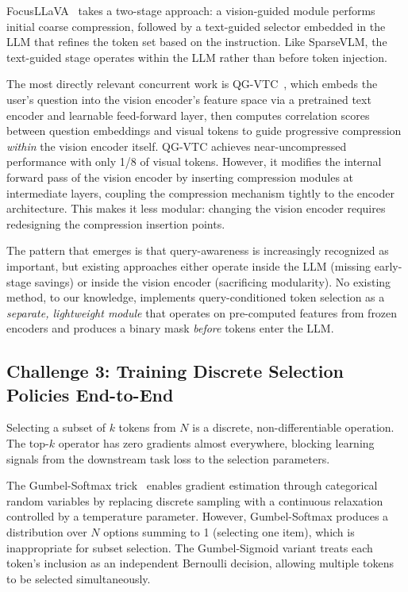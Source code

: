 \documentclass[11pt,twocolumn]{article}
\begin{document}
FocusLLaVA~\cite{zhu2024focusllava} takes a two-stage approach: a vision-guided module performs initial coarse compression, followed by a text-guided selector embedded in the LLM that refines the token set based on the instruction. Like SparseVLM, the text-guided stage operates within the LLM rather than before token injection.

The most directly relevant concurrent work is QG-VTC~\cite{li2025qgvtc}, which embeds the user's question into the vision encoder's feature space via a pretrained text encoder and learnable feed-forward layer, then computes correlation scores between question embeddings and visual tokens to guide progressive compression \emph{within} the vision encoder itself. QG-VTC achieves near-uncompressed performance with only 1/8 of visual tokens. However, it modifies the internal forward pass of the vision encoder by inserting compression modules at intermediate layers, coupling the compression mechanism tightly to the encoder architecture. This makes it less modular: changing the vision encoder requires redesigning the compression insertion points.

The pattern that emerges is that query-awareness is increasingly recognized as important, but existing approaches either operate inside the LLM (missing early-stage savings) or inside the vision encoder (sacrificing modularity). No existing method, to our knowledge, implements query-conditioned token selection as a \emph{separate, lightweight module} that operates on pre-computed features from frozen encoders and produces a binary mask \emph{before} tokens enter the LLM.

\subsection{Challenge 3: Training Discrete Selection Policies End-to-End}

Selecting a subset of $k$ tokens from $N$ is a discrete, non-differentiable operation. The top-$k$ operator has zero gradients almost everywhere, blocking learning signals from the downstream task loss to the selection parameters.

The Gumbel-Softmax trick~\cite{jang2017categorical, maddison2017concrete} enables gradient estimation through categorical random variables by replacing discrete sampling with a continuous relaxation controlled by a temperature parameter. However, Gumbel-Softmax produces a distribution over $N$ options summing to 1 (selecting one item), which is inappropriate for subset selection. The Gumbel-Sigmoid variant treats each token's inclusion as an independent Bernoulli decision, allowing multiple tokens to be selected simultaneously.
\end{document}
